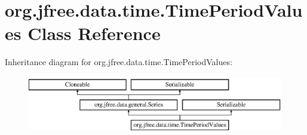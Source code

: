 \hypertarget{classorg_1_1jfree_1_1data_1_1time_1_1_time_period_values}{}\section{org.\+jfree.\+data.\+time.\+Time\+Period\+Values Class Reference}
\label{classorg_1_1jfree_1_1data_1_1time_1_1_time_period_values}
Inheritance diagram for org.\+jfree.\+data.\+time.\+Time\+Period\+Values\+:\begin{figure}[H]
\begin{center}
\leavevmode
\includegraphics[height=2.445415cm]{classorg_1_1jfree_1_1data_1_1time_1_1_time_period_values}
\end{center}
\end{figure}
